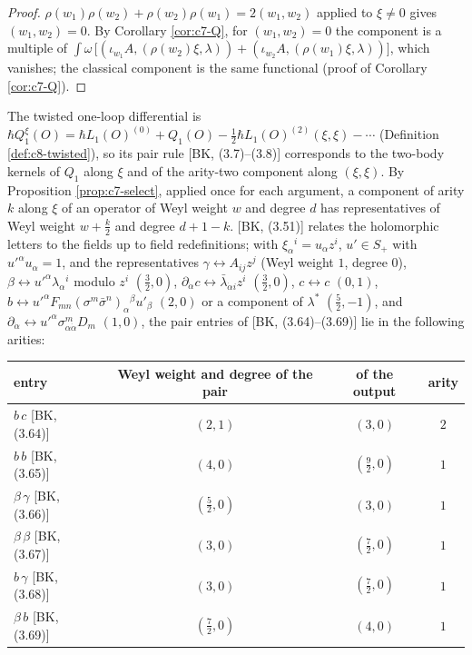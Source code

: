 \begin{proof}
$\rho(w_1)\rho(w_2)+\rho(w_2)\rho(w_1)=2(w_1,w_2)$ applied to $\xi\ne0$ gives $(w_1,w_2)=0$. By Corollary \ref{cor:c7-Q}, for $(w_1,w_2)=0$ the component is a multiple of $\int\omega\,\big[(\iota_{w_1}A,(\rho(w_2)\xi,\lambda))+(\iota_{w_2}A,(\rho(w_1)\xi,\lambda))\big]$, which vanishes; the classical component is the same functional (proof of Corollary \ref{cor:c7-Q}).
\end{proof}

\begin{remark}
\label{rem:c11-twist}
The twisted one-loop differential is $\hbar Q^\xi_1(O)=\hbar L_1(O)^{(0)}+Q_1(O)-\tfrac12\hbar L_1(O)^{(2)}(\xi,\xi)-\cdots$ (Definition \ref{def:c8-twisted}), so its pair rule [BK, (3.7)--(3.8)] corresponds to the two-body kernels of $Q_1$ along $\xi$ and of the arity-two component along $(\xi,\xi)$. By Proposition \ref{prop:c7-select}, applied once for each argument, a component of arity $k$ along $\xi$ of an operator of Weyl weight $w$ and degree $d$ has representatives of Weyl weight $w+\tfrac k2$ and degree $d+1-k$. [BK, (3.51)] relates the holomorphic letters to the fields up to field redefinitions; with $\xi_\alpha{}^i=u_\alpha z^i$, $u'\in S_+$ with $u'^\alpha u_\alpha=1$, and the representatives $\gamma\leftrightarrow A_{ij}z^j$ (Weyl weight $1$, degree $0$), $\beta\leftrightarrow u'^\alpha\lambda_\alpha{}^i$ modulo $z^i$ $(\tfrac32,0)$, $\partial_{\dot\alpha}c\leftrightarrow\bar\lambda_{\dot\alpha i}z^i$ $(\tfrac32,0)$, $c\leftrightarrow c$ $(0,1)$, $b\leftrightarrow u'^\alpha F_{mn}(\sigma^m\bar\sigma^n)_\alpha{}^\beta u'_\beta$ $(2,0)$ or a component of $\lambda^*$ $(\tfrac52,-1)$, and $\partial_{\dot\alpha}\leftrightarrow u'^\alpha\sigma^m_{\alpha\dot\alpha}D_m$ $(1,0)$, the pair entries of [BK, (3.64)--(3.69)] lie in the following arities:

\begin{tabular}{l|c|c|c}
entry & Weyl weight and degree of the pair & of the output & arity\\
\hline
$b\,c$ [BK, (3.64)] & $(2,1)$ & $(3,0)$ & $2$\\
$b\,b$ [BK, (3.65)] & $(4,0)$ & $(\tfrac92,0)$ & $1$\\
$\beta\,\gamma$ [BK, (3.66)] & $(\tfrac52,0)$ & $(3,0)$ & $1$\\
$\beta\,\beta$ [BK, (3.67)] & $(3,0)$ & $(\tfrac72,0)$ & $1$\\
$b\,\gamma$ [BK, (3.68)] & $(3,0)$ & $(\tfrac72,0)$ & $1$\\
$\beta\,b$ [BK, (3.69)] & $(\tfrac72,0)$ & $(4,0)$ & $1$\\
\end{tabular}


\end{remark}
